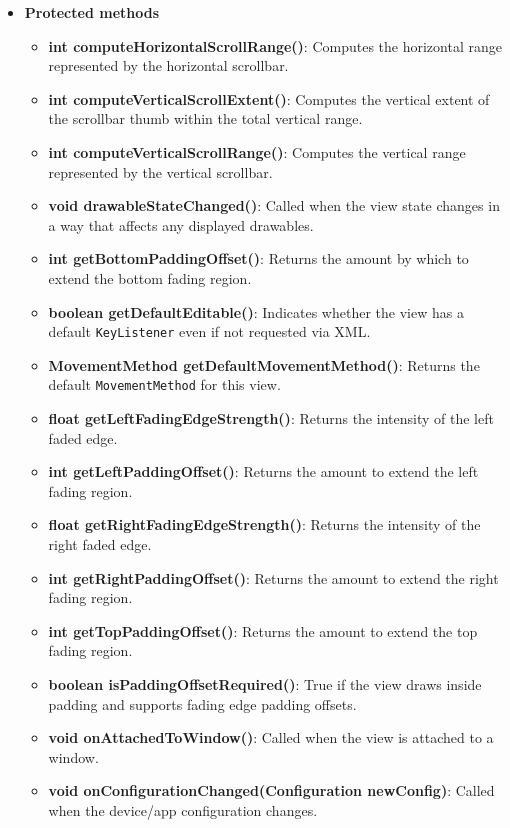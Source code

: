 \documentclass{report}
\begin{document}
\begin{itemize}
        \item \textbf{Protected methods}
            \begin{itemize}
                \item \textbf{int computeHorizontalScrollRange()}: Computes the horizontal range represented by the horizontal scrollbar.
                \item \textbf{int computeVerticalScrollExtent()}: Computes the vertical extent of the scrollbar thumb within the total vertical range.
                \item \textbf{int computeVerticalScrollRange()}: Computes the vertical range represented by the vertical scrollbar.
                \item \textbf{void drawableStateChanged()}: Called when the view state changes in a way that affects any displayed drawables.
                \item \textbf{int getBottomPaddingOffset()}: Returns the amount by which to extend the bottom fading region.
                \item \textbf{boolean getDefaultEditable()}: Indicates whether the view has a default \texttt{KeyListener} even if not requested via XML.
                \item \textbf{MovementMethod getDefaultMovementMethod()}: Returns the default \texttt{MovementMethod} for this view.
                \item \textbf{float getLeftFadingEdgeStrength()}: Returns the intensity of the left faded edge.
                \item \textbf{int getLeftPaddingOffset()}: Returns the amount to extend the left fading region.
                \item \textbf{float getRightFadingEdgeStrength()}: Returns the intensity of the right faded edge.
                \item \textbf{int getRightPaddingOffset()}: Returns the amount to extend the right fading region.
                \item \textbf{int getTopPaddingOffset()}: Returns the amount to extend the top fading region.
                \item \textbf{boolean isPaddingOffsetRequired()}: True if the view draws inside padding and supports fading edge padding offsets.
                \item \textbf{void onAttachedToWindow()}: Called when the view is attached to a window.
                \item \textbf{void onConfigurationChanged(Configuration newConfig)}: Called when the device/app configuration changes.

\end{itemize}
\end{itemize}
\end{document}
